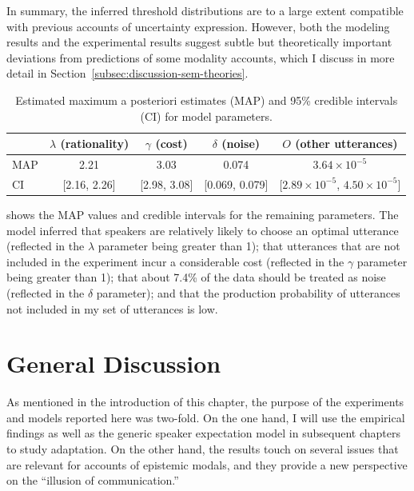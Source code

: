 In summary, the inferred threshold distributions are to a large extent compatible with previous accounts of uncertainty expression. However,
both the modeling results and the experimental results suggest subtle but theoretically important deviations from predictions of some modality accounts, which
I discuss in more detail in Section~\ref{subsec:discussion-sem-theories}.
 
 
 \begin{table}[ht!]
\center
\begin{tabular}{l | c | c | c | c }
     & $\lambda$ (rationality) & $\gamma$ (cost) & $\delta$ (noise) & $O$ (other utterances) \\
      \midrule
      MAP & 2.21 & 3.03 & 0.074 & $3.64 \times 10^{-5}$ \\
      CI & [2.16, 2.26] & [2.98, 3.08] &  [0.069, 0.079] &[$2.89 \times 10^{-5}$, $4.50  \times 10^{-5}$] \\
         \end{tabular}
\caption{Estimated maximum a posteriori estimates (MAP) and 95\% credible intervals (CI) for model parameters. \label{tbl:model-params}}
\end{table}

 shows the MAP values and credible intervals for the remaining parameters. The model inferred that speakers
are relatively likely to choose an optimal utterance (reflected in the $\lambda$ parameter being
greater than 1); that utterances that are not included in the experiment incur a considerable cost  (reflected in the $\gamma$ parameter being greater than 1); that about 7.4\%
of the data should be treated as noise (reflected in the $\delta$ parameter); and that the production probability of utterances not included in my set of utterances is low. 

\section{General Discussion}
\label{sec:chapter-3-gd}

As mentioned in the introduction of this chapter, the purpose of the experiments and models reported here was two-fold. On the one hand, 
I will use the empirical findings as well as the generic speaker expectation model in subsequent chapters to study adaptation. On the other hand,
the results touch on several issues that are relevant for accounts of epistemic modals, and they provide a new perspective on the ``illusion of communication.'' 

